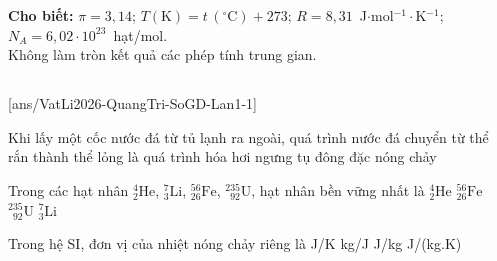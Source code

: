 \def\CheDo{solcolor}%
\def\tenchuong{Sở GD\&ĐT Quảng Trị -- Lần 1}
\def\thuonghieu{VẬT LÍ 12 -- Eduzy.com.vn}
\def\TachCauDS{1}
\def\TachCauLG{1}




	\noindent\textbf{Cho biết:} $\pi=3{,}14$; $T(\text{K})=t\,(^\circ\text{C})+273$; $R=8{,}31$~J$\cdot$mol$^{-1}\cdot$K$^{-1}$; $N_A=6{,}02\cdot 10^{23}$~hạt/mol.\\
	Không làm tròn kết quả các phép tính trung gian.

	\noindent
	\subsection*{}
	\setcounter{ex}{0}
	[ans/VatLi2026-QuangTri-SoGD-Lan1-1]

	\begin{ex}%
		Khi lấy một cốc nước đá từ tủ lạnh ra ngoài, quá trình nước đá chuyển từ thể rắn thành thể lỏng là quá trình
		\choice
		{hóa hơi}
		{ngưng tụ}
		{đông đặc}
		{\True nóng chảy}
	\end{ex}

	\begin{ex}%
		Trong các hạt nhân ${}^4_2\text{He}$, ${}^7_3\text{Li}$, ${}^{56}_{26}\text{Fe}$, $^{235}_{\phantom{2}92}\text{U}$, hạt nhân bền vững nhất là
		\choice
		{${}^4_2\text{He}$}
		{\True ${}^{56}_{26}\text{Fe}$}
		{$^{235}_{\phantom{2}92}\text{U}$}
		{${}^7_3\text{Li}$}
	\end{ex}

	\begin{ex}%
		Trong hệ SI, đơn vị của nhiệt nóng chảy riêng là
		\choice
		{J/K}
		{kg/J}
		{\True J/kg}
		{J/(kg.K)}
	\end{ex}

